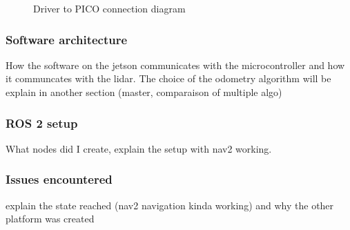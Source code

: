 \documentclass[11pt]{article}
\begin{document}
                
                
                \begin{figure}[h]
                    \centering
                    Driver to PICO connection diagram
                    \label{fig:driver_to_pico}
                \end{figure}

            
            
            \subsubsection{Software architecture}

            How the software on the jetson communicates with the microcontroller and how it communcates with the lidar. The choice of the odometry algorithm will be explain in another section (master, comparaison of multiple algo)


            \subsubsection{ROS 2 setup}
            What nodes did I create, explain the setup with nav2 working.

            
            \subsubsection{Issues encountered}
                
            explain the state reached (nav2 navigation kinda working) and why the other platform was created
\end{document}
